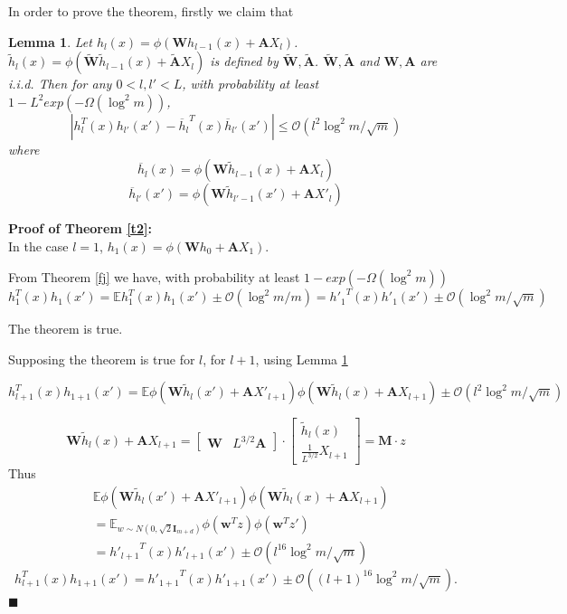 \documentclass{article}
\newcommand{\cO}{\mathcal{O}}
\newtheorem{lem}[theo]{\textbf{Lemma}}
\newcommand*{\QEDA}{\hfill\ensuremath{\blacksquare}}%
\begin{document}
In order to prove the theorem, firstly we claim that
\begin{lem}\label{l3}
Let $h_l(x)=\phi(\bm{W}h_{l-1}(x)+\bm{A}X_l)$. $\widetilde{h}_l(x)=\phi(\widetilde{\bm{W}}\widetilde{h}_{l-1}(x)+\widetilde{\bm{A}}X_l)$ is defined by  $\widetilde{\bm{W}}, \widetilde{\bm{A}}$. $\widetilde{\bm{W}}, \widetilde{\bm{A}}$ and $\bm{W}, \bm{A}$ are i.i.d. Then for any $0<l,l'<L$, with probability at least $1-L^2exp(-\Omega(\log^2m))$,
\begin{equation}
|h_{l}^T(x)h_{l'}(x')-  {\overline{h}_{l}}^{T}(x)\overline{h}_{l'}(x')|\leq \cO(l^{2}\log^2m/\sqrt{m})
\end{equation}
where
$$\overline{h}_l(x)=\phi(\bm{W}\widetilde{h}_{l-1}(x)+\bm{A}X_l)$$
$$\overline{h}_{l'}(x')=\phi(\bm{W}\widetilde{h}_{l'-1}(x')+\bm{A}X'_l)$$
\end{lem}

{\bf Proof of Theorem \ref{t2}:}\\
In the case $l=1$, $h_{1}(x)=\phi(\bm{W}h_0+\bm{A}X_1)$.

From Theorem \ref{fj} we have, with probability at least $1-exp(-\Omega(\log^2m))$
\begin{equation}
h_{1}^T(x)h_{1}(x')=\mathbb{E}h_{1}^T(x)h_{1}(x')\pm \cO(\log^2m/m)={h'_{1}}^T(x)h'_{1}(x')\pm \cO(\log^2m/\sqrt{m})
\end{equation}

The theorem is true.

Supposing the theorem is true for $l$, for $l+1$, using Lemma \ref{l3}

\begin{equation}
 h_{l+1}^T(x)h_{1+1}(x')=\mathbb{E}\phi(\bm{W}\widetilde{h}_{l}(x')+\bm{A}X'_{l+1})\phi(\bm{W}\widetilde{h}_{l}(x)+\bm{A}X_{l+1})\pm \cO(l^2\log^2m/\sqrt{m})
\end{equation}

\begin{equation}
\bm{W}\widetilde{h}_{l}(x)+\bm{A}X_{l+1}=
\begin{bmatrix}
\bm{W} &L^{3/2}\bm{A}
\end{bmatrix}
\cdot
\begin{bmatrix}
\widetilde{h}_{l}(x)\\
\frac{1}{L^{3/2}}X_{l+1}
\end{bmatrix}
=\bm{M}\cdot z
\end{equation}
Thus
\begin{equation}
\begin{aligned}
&\mathbb{E}\phi(\bm{W}\widetilde{h}_{l}(x')+\bm{A}X'_{l+1})\phi(\bm{W}\widetilde{h}_{l}(x)+\bm{A}X_{l+1})\\
&=\mathbb{E}_{w\sim N(0,\sqrt{2}\bm{I}_{m+d})}\phi(\bm{w}^Tz)\phi(\bm{w}^Tz')\\
&= {h'_{l+1}}^T(x)h'_{l+1}(x')\pm \cO(l^{16}\log^2m/\sqrt{m})
\end{aligned}
\end{equation}
$$h_{l+1}^T(x)h_{1+1}(x')= {h'_{1+1}}^T(x)h'_{1+1}(x')\pm \cO((l+1)^{16}\log^2m/\sqrt{m}).$$
\QEDA
\end{document}
